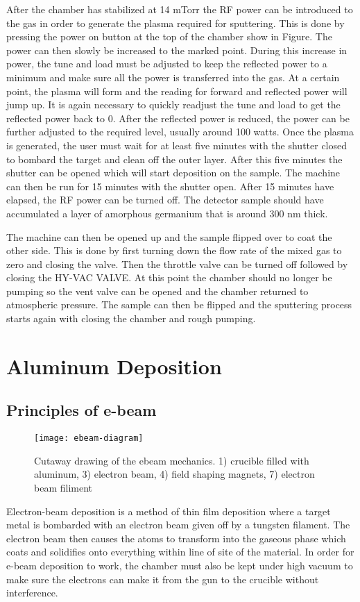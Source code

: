 After the chamber has stabilized at 14 mTorr the RF power can be introduced to the gas in order to generate the plasma required for sputtering.
This is done by pressing the power on button at the top of the chamber show in Figure.
The power can then slowly be increased to the marked point.
During this increase in power, the tune and load must be adjusted to keep the reflected power to a minimum and make sure all the power is transferred into the gas.
At a certain point, the plasma will form and the reading for forward and reflected power will jump up.
It is again necessary to quickly readjust the tune and load to get the reflected power back to 0.
After the reflected power is reduced, the power can be further adjusted to the required level, usually around 100 watts.
Once the plasma is generated, the user must wait for at least five minutes with the shutter closed to bombard the target and clean off the outer layer.
After this five minutes the shutter can be opened which will start deposition on the sample.
The machine can then be run for 15 minutes with the shutter open.
After 15 minutes have elapsed, the RF power can be turned off.
The detector sample should have accumulated a layer of amorphous germanium that is around 300 nm thick.

The machine can then be opened up and the sample flipped over to coat the other side.
This is done by first turning down the flow rate of the mixed gas to zero and closing the valve.
Then the throttle valve can be turned off followed by closing the HY-VAC VALVE.
At this point the chamber should no longer be pumping so the vent valve can be opened and the chamber returned to atmospheric pressure.
The sample can then be flipped and the sputtering process starts again with closing the chamber and rough pumping.



\section{Aluminum Deposition}
\subsection{Principles of e-beam}
\begin{figure}[htpb]
\centering
\texttt{[image: ebeam-diagram]}
\caption{Cutaway drawing of the ebeam mechanics. 1) crucible filled with aluminum, 3) electron beam, 4) field shaping magnets, 7) electron beam filiment}
\label{fig:ebeam-diagram}
\end{figure}
Electron-beam deposition is a method of thin film deposition where a target metal is bombarded with an electron beam given off by a tungsten filament.
The electron beam then causes the atoms to transform into the gaseous phase which coats and solidifies onto everything within line of site of the material.
In order for e-beam deposition to work, the chamber must also be kept under high vacuum to make sure the electrons can make it from the gun to the crucible without interference.

